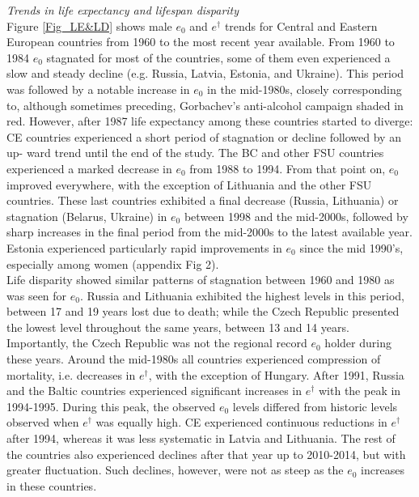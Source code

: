 \documentclass{article}
\begin{document}
\begin{spacing}{1.5}
\emph{Trends in life expectancy and lifespan disparity}\\

Figure \ref{Fig_LE&LD} shows male $e_0$ and $e^{\dagger}$ trends for Central and Eastern European countries from 1960 to the most recent year available. From 1960 to 1984 $e_0$ stagnated for most of the countries, some of them even experienced a slow and steady decline (e.g. Russia, Latvia, Estonia, and Ukraine). This period was followed by a notable increase in $e_0$ in the mid-1980s, closely corresponding to, although sometimes preceding, Gorbachev's anti-alcohol campaign shaded in red. However, after 1987 life expectancy among these countries started to diverge: CE countries experienced a short period of stagnation or decline followed by an up- ward trend until the end of the study. The BC and other FSU countries experienced a marked decrease in $e_0$ from 1988 to 1994. From that point on, $e_0$ improved everywhere, with the exception of Lithuania and the other FSU countries. These last countries exhibited a final decrease (Russia, Lithuania) or stagnation (Belarus, Ukraine) in $e_0$ between 1998 and the mid-2000s, followed by sharp increases in the final period from the mid-2000s to the latest available year. Estonia experienced particularly rapid improvements in $e_0$ since the mid 1990's, especially among women (appendix Fig 2). \\

Life disparity showed similar patterns of stagnation between 1960 and 1980 as was seen for $e_0$. Russia and Lithuania exhibited the highest levels in this period, between 17 and 19 years lost due to death; while the Czech Republic presented the lowest level throughout the same years, between 13 and 14 years. Importantly, the Czech Republic was not the regional record $e_0$ holder during these years. Around the mid-1980s all countries experienced compression of mortality, i.e. decreases in $e^{\dagger}$, with the exception of Hungary. After 1991, Russia and the Baltic countries experienced significant increases in $e^{\dagger}$ with the peak in 1994-1995. During this peak, the observed $e_0$ levels differed from historic levels observed when $e^{\dagger}$ was equally high. CE experienced continuous reductions in $e^{\dagger}$ after 1994, whereas it was less systematic in Latvia and Lithuania. The rest of the countries also experienced declines after that year up to 2010-2014, but with greater fluctuation. Such declines, however, were not as steep as the $e_0$ increases in these countries.\\
 

\end{spacing}
\end{document}
